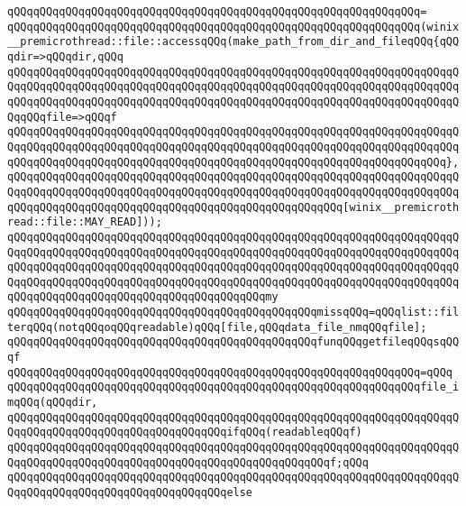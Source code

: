 \verb|qQQqqQQqqQQqqQQqqQQqqQQqqQQqqQQqqQQqqQQqqQQqqQQqqQQqqQQqqQQqqQQq=|\newline
\verb|qQQqqQQqqQQqqQQqqQQqqQQqqQQqqQQqqQQqqQQqqQQqqQQqqQQqqQQqqQQqqQQq(winix__premicrothread::file::accessqQQq(make_path_from_dir_and_fileqQQq{qQQqdir=>qQQqdir,qQQq|\newline
\verb|qQQqqQQqqQQqqQQqqQQqqQQqqQQqqQQqqQQqqQQqqQQqqQQqqQQqqQQqqQQqqQQqqQQqqQQqqQQqqQQqqQQqqQQqqQQqqQQqqQQqqQQqqQQqqQQqqQQqqQQqqQQqqQQqqQQqqQQqqQQqqQQqqQQqqQQqqQQqqQQqqQQqqQQqqQQqqQQqqQQqqQQqqQQqqQQqqQQqqQQqqQQqqQQqqQQqqQQqfile=>qQQqf|\newline
\verb|qQQqqQQqqQQqqQQqqQQqqQQqqQQqqQQqqQQqqQQqqQQqqQQqqQQqqQQqqQQqqQQqqQQqqQQqqQQqqQQqqQQqqQQqqQQqqQQqqQQqqQQqqQQqqQQqqQQqqQQqqQQqqQQqqQQqqQQqqQQqqQQqqQQqqQQqqQQqqQQqqQQqqQQqqQQqqQQqqQQqqQQqqQQqqQQqqQQqqQQqqQQqqQQq},|\newline
\verb|qQQqqQQqqQQqqQQqqQQqqQQqqQQqqQQqqQQqqQQqqQQqqQQqqQQqqQQqqQQqqQQqqQQqqQQqqQQqqQQqqQQqqQQqqQQqqQQqqQQqqQQqqQQqqQQqqQQqqQQqqQQqqQQqqQQqqQQqqQQqqQQqqQQqqQQqqQQqqQQqqQQqqQQqqQQqqQQqqQQqqQQqqQQqqQQq[winix__premicrothread::file::MAY_READ]));|\newline
\verb|qQQqqQQqqQQqqQQqqQQqqQQqqQQqqQQqqQQqqQQqqQQqqQQqqQQqqQQqqQQqqQQqqQQqqQQqqQQqqQQqqQQqqQQqqQQqqQQqqQQqqQQqqQQqqQQqqQQqqQQqqQQqqQQqqQQqqQQqqQQqqQQqqQQqqQQqqQQqqQQqqQQqqQQqqQQqqQQqqQQqqQQqqQQqqQQqqQQqqQQqqQQqqQQqqQQqqQQqqQQqqQQqqQQqqQQqqQQqqQQqqQQqqQQqqQQqqQQqqQQqqQQqqQQqqQQqqQQqqQQqqQQqqQQqqQQqqQQqqQQqqQQqqQQqqQQqqQQqqQQqmy|\newline
\verb|qQQqqQQqqQQqqQQqqQQqqQQqqQQqqQQqqQQqqQQqqQQqqQQqmissqQQq=qQQqlist::filterqQQq(notqQQqoqQQqreadable)qQQq[file,qQQqdata_file_nmqQQqfile];|\newline
\newline
\verb|qQQqqQQqqQQqqQQqqQQqqQQqqQQqqQQqqQQqqQQqqQQqqQQqfunqQQqgetfileqQQqsqQQqf|\newline
\verb|qQQqqQQqqQQqqQQqqQQqqQQqqQQqqQQqqQQqqQQqqQQqqQQqqQQqqQQqqQQqqQQq=qQQq|\newline
\verb|qQQqqQQqqQQqqQQqqQQqqQQqqQQqqQQqqQQqqQQqqQQqqQQqqQQqqQQqqQQqqQQqfile_imqQQq(qQQqdir,|\newline
\newline
\verb|qQQqqQQqqQQqqQQqqQQqqQQqqQQqqQQqqQQqqQQqqQQqqQQqqQQqqQQqqQQqqQQqqQQqqQQqqQQqqQQqqQQqqQQqqQQqqQQqqQQqqQQqifqQQq(readableqQQqf)|\newline
\verb|qQQqqQQqqQQqqQQqqQQqqQQqqQQqqQQqqQQqqQQqqQQqqQQqqQQqqQQqqQQqqQQqqQQqqQQqqQQqqQQqqQQqqQQqqQQqqQQqqQQqqQQqqQQqqQQqqQQqqQQqf;qQQq|\newline
\verb|qQQqqQQqqQQqqQQqqQQqqQQqqQQqqQQqqQQqqQQqqQQqqQQqqQQqqQQqqQQqqQQqqQQqqQQqqQQqqQQqqQQqqQQqqQQqqQQqqQQqqQQqelse|\newline
